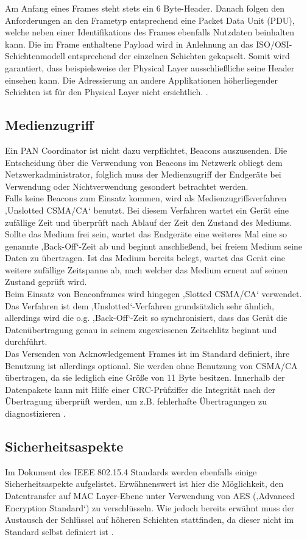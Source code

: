 Am Anfang eines Frames steht stets ein 6 Byte-Header. Danach folgen den Anforderungen an den Frametyp entsprechend eine Packet Data Unit (PDU), welche neben einer Identifikations des Frames ebenfalls Nutzdaten beinhalten kann. Die im Frame enthaltene Payload wird in Anlehnung an das ISO/OSI-Schichtenmodell entsprechend der einzelnen Schichten gekapselt. Somit wird garantiert, dass beispielsweise der Physical Layer ausschließliche seine Header einsehen kann. Die Adressierung an andere Applikationen höherliegender Schichten ist für den Physical Layer nicht ersichtlich.
\cite{d:hesse} \cite{d:ieee}.

\subsection{Medienzugriff}\label{ss:Medienzugriff}

Ein PAN Coordinator ist nicht dazu verpflichtet, Beacons auszusenden. Die Entscheidung über die Verwendung von Beacons im Netzwerk obliegt dem Netzwerkadministrator, folglich muss der Medienzugriff der Endgeräte bei Verwendung oder Nichtverwendung gesondert betrachtet werden. \\
Falls keine Beacons zum Einsatz kommen, wird als Medienzugriffsverfahren ‚Unslotted CSMA/CA‘ benutzt. Bei diesem Verfahren wartet ein Gerät eine zufällige Zeit und überprüft nach Ablauf der Zeit den Zustand des Mediums. Sollte das Medium frei sein, wartet das Endgeräte eine weiteres Mal eine so genannte ‚Back-Off‘-Zeit ab und beginnt anschließend, bei freiem Medium seine Daten zu übertragen. Ist das Medium bereits belegt, wartet das Gerät eine weitere zufällige Zeitspanne ab, nach welcher das Medium erneut auf seinen Zustand geprüft wird.\\
Beim Einsatz von Beaconframes wird hingegen ‚Slotted CSMA/CA‘ verwendet. Das Verfahren ist dem ‚Unslotted‘-Verfahren grundsätzlich sehr ähnlich, allerdings wird die o.g. ‚Back-Off‘-Zeit so synchronisiert, dass das Gerät die Datenübertragung genau in seinem zugewiesenen Zeitschlitz beginnt und durchführt. \\
Das Versenden von Acknowledgement Frames ist im Standard definiert, ihre Benutzung ist allerdings optional. Sie werden ohne Benutzung von CSMA/CA übertragen, da sie lediglich eine Größe von 11 Byte besitzen. Innerhalb der Datenpakete kann mit Hilfe einer CRC-Prüfziffer die Integrität nach der Übertragung überprüft werden, um z.B. fehlerhafte Übertragungen zu diagnostizieren \cite{d:hesse} \cite{d:ieee}.

\subsection{Sicherheitsaspekte}\label{ss:Sicherheitsaspekte}

Im Dokument des IEEE 802.15.4 Standards werden ebenfalls einige Sicherheitsaspekte aufgelistet. Erwähnenswert ist hier die Möglichkeit, den Datentransfer auf MAC Layer-Ebene unter Verwendung von AES (‚Advanced Encryption Standard‘) zu verschlüsseln. Wie jedoch bereits erwähnt muss der Austausch der Schlüssel auf höheren Schichten stattfinden, da dieser nicht im Standard selbst definiert ist \cite{d:hesse} \cite{d:ieee}.